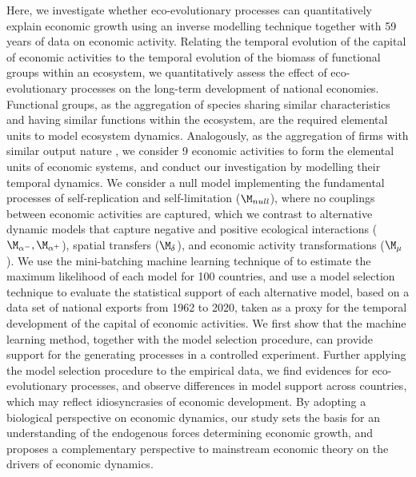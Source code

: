   Here, we investigate whether eco-evolutionary processes can quantitatively explain economic growth using an inverse modelling technique together with 59 years of data on economic activity. Relating the temporal evolution of the capital of economic activities to the temporal evolution of the biomass of functional groups within an ecosystem, we quantitatively assess the effect of eco-evolutionary processes on the long-term development of national economies.
  Functional groups, as the aggregation of species sharing similar characteristics and having similar functions within the ecosystem, are the required elemental units to model ecosystem dynamics. Analogously, as the aggregation of firms with similar output nature \citep{Applegate2021}, we consider 9 economic activities to form the elemental units of economic systems, and  conduct our investigation by modelling their temporal dynamics.
  We consider a null model implementing the fundamental processes of self-replication and self-limitation ($\modnull$), where no couplings between economic activities are captured, which we contrast to alternative dynamic models that capture negative and positive ecological interactions ($\modalphan,\modalphap$), spatial transfers ($\moddelta$), and economic activity transformations ($\modmu$).
  We use the mini-batching machine learning technique of \cite{Boussange2022a} to estimate the maximum likelihood of each model for 100 countries, and use a model selection technique to evaluate the statistical support of each alternative model, based on a data set of national exports from 1962 to 2020, taken as a proxy for the temporal development of the capital of economic activities. 
  We first show that the machine learning method, together with the model selection procedure, can provide support for the generating processes in a controlled experiment.
  Further applying the model selection procedure to the empirical data, we find evidences for eco-evolutionary processes, and observe differences in model support across countries, which may reflect idiosyncrasies of economic development. 
  By adopting a biological perspective on economic dynamics, our study sets the basis for an understanding of the endogenous forces determining economic growth, and proposes a complementary perspective to mainstream economic theory \citep{10.1093/cje/bet027} on the drivers of economic dynamics.

